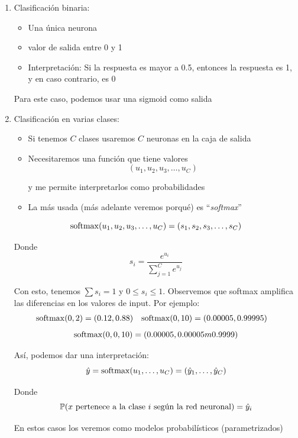 \begin{enumerate}
    \item Clasificación binaria:
    \begin{itemize}
        \item Una única neurona
        \item valor de salida entre 0 y 1
        \item Interpretación: Si la respuesta es mayor a 0.5, entonces la respuesta es 1, y en caso contrario, es 0
        
        
    \end{itemize}
    Para este caso, podemos usar una sigmoid como salida
    
    \item Clasificación en varias clases:
    \begin{itemize}
        \item Si tenemos $C$ clases usaremos $C$ neuronas en la caja de salida
        \item Necesitaremos una función que tiene valores
        \begin{equation*}
            (u_1, u_2, u_3,\ldots, u_C)
        \end{equation*}
        
        y me permite interpretarlos como probabilidades
        \item La más usada (más adelante veremos porqué) es ``\textit{softmax}''
    \end{itemize}
    \begin{equation*}
        \operatorname{softmax}(u_1, u_2, u_3,\ldots, u_C) = (s_1, s_2, s_3, \ldots, s_C)
    \end{equation*}
    
    Donde
    \begin{equation*}
        s_i = \frac{e^{u_i}}{\sum_{j=1}^{C}e^{u_j}}
    \end{equation*}
    
    Con esto, tenemos $\sum s_i = 1$ y $0\leq s_i\leq1$. Observemos que softmax amplifica las diferencias en los valores de input. Por ejemplo:
    \begin{align*}
        \operatorname{softmax}(0, 2) &= (0.12, 0.88) &
        \operatorname{softmax}(0, 10) &= (0.00005, 0.99995)
    \end{align*}
    \begin{equation*}
        \operatorname{softmax}(0, 0, 10) = (0.00005, 0.00005m 0.9999)
    \end{equation*}
    
    Así, podemos dar una interpretación:
    \begin{equation*}
        \hat{y} = \operatorname{softmax}(u_1, \ldots, u_C) = (\hat{y}_1, \ldots, \hat{y}_C)
    \end{equation*}
    
    Donde
    \begin{equation*}
        \mathbb{P}(x\mbox{ pertenece a la clase $i$ según la red neuronal}) = \hat{y}_i
    \end{equation*}
    
    En estos casos los veremos como modelos probabilísticos (parametrizados)
\end{enumerate}

